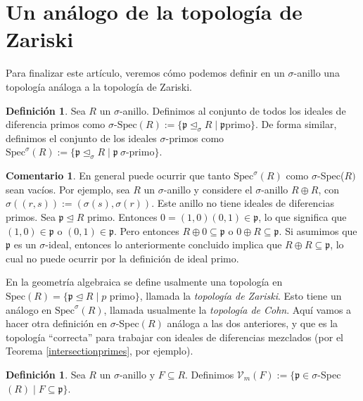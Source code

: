 \documentclass[letterpaper]{article}
\def\Spec{\text{Spec}}
\def\Vm{\mathcal{V}_m}
\def\p{\mathfrak{p}}
\def\s{\sigma}
\def\si{\unlhd_{\sigma}}
\theoremstyle{definition}
\newtheorem{rem}[Satz]{Comentario}
\newtheorem{defn}[Satz]{Definici\'on}
\begin{document}
\section{Un an\'alogo de la topolog\'ia de Zariski}

Para finalizar este art\'iculo, veremos c\'omo podemos definir en un $\sigma$-anillo una topolog\'ia an\'aloga a la topolog\'ia de Zariski.

\begin{defn}
Sea $R$ un $\sigma$-anillo. Definimos al conjunto de todos los ideales de diferencia primos como $\s$-$\Spec(R):= \{ \p \si R \mid \p \text{primo}\}$. De forma similar, definimos el conjunto de los ideales $\s$-primos como $\Spec^\s(R):= \{ \p \si R \mid \p ~ \s\text{-primo}\}$.
\end{defn}

\begin{rem}
En general puede ocurrir que tanto $\Spec^\sigma(R)$ como $\sigma$-Spec($R)$ sean vac\'ios. Por ejemplo, sea $R$ un $\sigma$-anillo y considere el $\sigma$-anillo $R \oplus R$, con $\s( (r,s)):= (\s(s),\s(r))$. Este anillo no tiene ideales de diferencias primos. Sea $\p \unlhd R$ primo. Entonces $0 = (1,0)(0,1) \in \p$, lo que significa que $(1,0) \in \p$ o $(0,1) \in \p$. Pero entonces $R \oplus 0 \subseteq \p$ o $0 \oplus R \subseteq \p$. Si asumimos que $\p$ es un $\sigma$-ideal, entonces
lo anteriormente concluido implica que $R \oplus R \subseteq \p$, lo cual no puede ocurrir por la definici\'on de ideal primo.
\end{rem}

En la geometr\'ia algebraica se define usalmente una topolog\'ia en $\Spec(R) = \{ \p \unlhd R \mid p \text { primo} \}$, llamada la \emph{topolog\'ia de Zariski}. Esto tiene un an\'alogo en $\Spec^\s(R)$, llamada usualmente la \emph{topolog\'ia de Cohn}. Aqu\'i vamos a hacer otra definici\'on en $\s$-Spec$(R)$ an\'aloga a las dos anteriores, y que es la topolog\'ia ``correcta'' para trabajar con ideales de diferencias mezclados (por el Teorema \ref{intersectionprimes}, por ejemplo).

\begin{defn}
Sea $R$ un $\sigma$-anillo y $F \subseteq R$. Definimos $\Vm (F):= \{ \p \in \s$-Spec$(R) \mid F \subseteq \p \}$. 
\end{defn}
\end{document}
